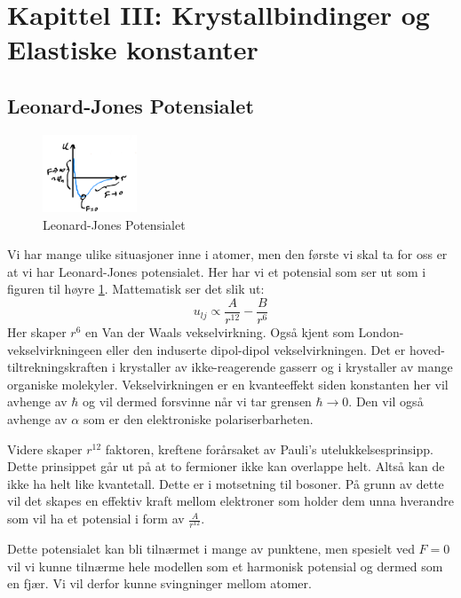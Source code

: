 \documentclass{article}
\begin{document}
\newpage
\section{Kapittel III: Krystallbindinger og Elastiske konstanter}
\subsection{Leonard-Jones Potensialet}
\begin{figure}
    \centering
    \includegraphics[width=0.25\textwidth]{bilder/leonard_jones_potensialet.png}
    \caption{Leonard-Jones Potensialet}
    \label{fig:leonard_jones_potensialet}
\end{figure}
Vi har mange ulike situasjoner inne i atomer, men den første vi skal ta for oss er at vi har Leonard-Jones potensialet. Her har vi et potensial som ser ut som i figuren til høyre \ref{fig:leonard_jones_potensialet}. Mattematisk ser det slik ut:
\begin{equation}
    \label{eq:leonard_jones_potensialet}
    u_{lj} \propto \frac{A}{r^{12}} - \frac{B}{r^6}
\end{equation}
Her skaper $r^6$ en Van der Waals vekselvirkning. Også kjent som London-vekselvirkningeen eller den induserte dipol-dipol vekselvirkningen. Det er hoved-tiltrekningskraften i krystaller av ikke-reagerende gasserr og i krystaller av mange organiske molekyler. Vekselvirkningen er en kvanteeffekt siden konstanten her vil avhenge av $\hbar$ og vil dermed forsvinne når vi tar grensen $\hbar \rightarrow 0$. Den vil også avhenge av $\alpha$ som er den elektroniske polariserbarheten.

Videre skaper $r^{12}$ faktoren, kreftene forårsaket av Pauli's utelukkelsesprinsipp. Dette prinsippet går ut på at to fermioner ikke kan overlappe helt. Altså kan de ikke ha helt like kvantetall. Dette er i motsetning til bosoner. På grunn av dette vil det skapes en effektiv kraft mellom elektroner som holder dem unna hverandre som vil ha et potensial i form av $\frac{A}{r^{12}}$.

Dette potensialet kan bli tilnærmet i mange av punktene, men spesielt ved $F = 0$ vil vi kunne tilnærme hele modellen som et harmonisk potensial og dermed som en fjær. Vi vil derfor kunne svingninger mellom atomer.
\end{document}
